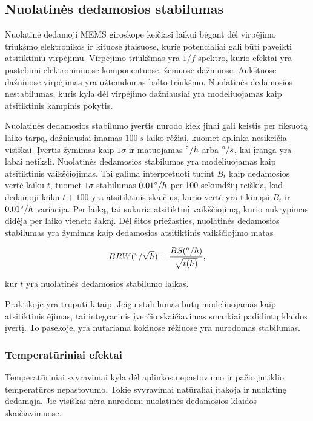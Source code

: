 \subsection{Nuolatinės dedamosios stabilumas}

Nuolatinė dedamoji MEMS giroskope keičiasi laikui bėgant dėl virpėjimo triukšmo elektronikos ir kituose įtaisuose, kurie potencialiai gali būti paveikti atsitiktiniu virpėjimu. Virpėjimo triukšmas yra $1/f$ spektro, kurio efektai yra pastebimi elektroniniuose komponentuose, žemuose dažniuose. Aukštuose dažniuose virpėjimas yra užtemdomas balto triukšmo. Nuolatinės dedamosios nestabilumas, kuris kyla dėl virpėjimo dažniausiai yra modeliuojamas kaip atsitiktinis kampinis pokytis.

Nuolatinės dedamosios stabilumo įvertis nurodo kiek jinai gali keistis per fiksuotą laiko tarpą, dažniausiai imamas $100~s$ laiko rėžiai, kuomet aplinka nesikeičia visiškai. Įvertis žymimas kaip $1\sigma$ ir matuojamas $\degree/h$ arba $\degree/s$, kai įranga yra labai netiksli. Nuolatinės dedamosios stabilumas yra modeliuojamas kaip atsitiktinis vaikščiojimas. Tai galima interpretuoti turint $B_t$ kaip dedamosios vertė laiku $t$, tuomet $1\sigma$ stabilumas $0.01\degree/h$ per 100 sekundžių reiškia, kad dedamoji laiku $t+100$ yra atsitiktinis skaičius, kurio vertė yra tikimąsi $B_t$ ir $0.01\degree/h$ variacija. Per laiką, tai sukuria atsitiktinį vaikščiojimą, kurio nukrypimas didėja per laiko vieneto šaknį. Dėl šitos priežasties, nuolatinės dedamosios stabilumas yra žymimas kaip dedamosios atsitiktinis vaikščiojimo matas

\begin{equation}
    BRW (\degree / \sqrt{h}) = \frac{BS(\degree/h)}{\sqrt{t(h)}},
\end{equation}

kur $t$ yra nuolatinės dedamosios stabilumo laikas.

Praktikoje yra truputi kitaip. Jeigu stabilumas būtų modeliuojamas kaip atsitiktinis ėjimas, tai integracinis įverčio skaičiavimas smarkiai padidintų klaidos įvertį. To pasekoje, yra nutariama kokiuose rėžiuose yra nurodomas stabilumas.

\subsubsection{Temperatūriniai efektai}

Temperatūriniai svyravimai kyla dėl aplinkos nepastovumo ir pačio jutiklio temperatūros nepastovumo. Tokie svyravimai natūraliai įtakoja ir nuolatinę dedamąja. Jie visiškai nėra nurodomi nuolatinės dedamosios klaidos skaičiavimuose.

